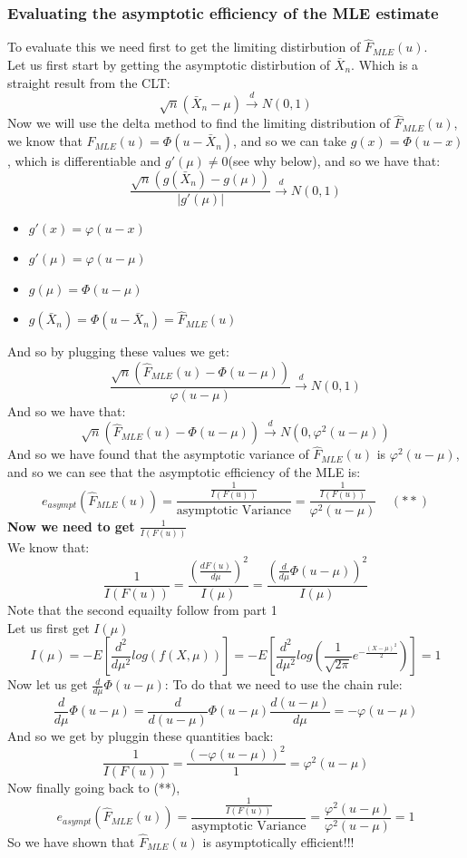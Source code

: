 \documentclass[12pt]{article}
\begin{document}
\subsubsection*{Evaluating the asymptotic efficiency of the MLE estimate}
To evaluate this we need first to get the limiting distirbution of $\hat{F}_{MLE}(u)$. \\ 
Let us first start by getting the asymptotic distirbution of $\bar{X}_n$. Which is a straight result from the CLT: 
\[
\sqrt{n}(\bar{X}_n - \mu) \xrightarrow{d} N(0,1)
\]
Now we will use the delta method to find the limiting distribution of $\hat{F}_{MLE}(u)$, we know that $\hat{F}_{MLE}(u) = \Phi(u-\bar{X}_n)$, and so we can take $g(x) = \Phi(u-x)$, which is differentiable and $g'(\mu) \neq 0$(see why below), and so we have that:
\[
\frac{\sqrt{n}(g(\bar{X}_n)-g(\mu))}{|g'(\mu)|} \xrightarrow{d} N(0,1)
\]
\begin{itemize}
  \item $g'(x) = \varphi(u-x)$
  \item $g'(\mu) = \varphi(u-\mu)$ \ \ \ \ \ 
  \item $g(\mu) = \Phi(u-\mu)$
  \item $g(\bar{X}_n) = \Phi(u-\bar{X}_n) =\hat{F}_{MLE}(u) $
\end{itemize}
And so by plugging these values we get:
\[
\frac{\sqrt{n}(\hat{F}_{MLE}(u)-\Phi(u-\mu))}{\varphi(u-\mu)} \xrightarrow{d} N(0,1)
\]
And so we have that:
\[
  \sqrt{n}(\hat{F}_{MLE}(u)-\Phi(u-\mu)) \xrightarrow{d} N(0,\varphi^2(u-\mu))
\]
And so we have found that the asymptotic variance of $\hat{F}_{MLE}(u)$ is $\varphi^2(u-\mu)$, and so we can see that the asymptotic efficiency of the MLE is:
\[
e_{asympt}(\hat{F}_{MLE}(u)) = \frac{\frac{1}{I(F(u))}}{\text{asymptotic Variance}} = \frac{\frac{1}{I(F(u))}}{\varphi^2(u-\mu)} \ \ \ \ \ (**)
\]
\textbf{Now we need to get $\frac{1}{I(F(u))}$}\\
We know that:
\[
\frac{1}{I(F(u))} = \frac{(\frac{dF(u)}{d\mu})^2}{I(\mu)} = \frac{(\frac{d}{d\mu}\Phi(u-\mu))^2}{I(\mu)}
\]
Note that the second equailty follow from part 1 \\ 
Let us first get $I(\mu)$
\[
I(\mu) = -E[\frac{d^2}{d\mu^2}log(f(X,\mu))] = -E[\frac{d^2}{d\mu^2}log(\frac{1}{\sqrt{2\pi}}e^{-\frac{(X-\mu)^2}{2}})] = 1 
\]
Now let us get $\frac{d}{d\mu}\Phi(u-\mu)$:
To do that we need to use the chain rule:
\[
\frac{d}{d\mu}\Phi(u-\mu) = \frac{d}{d(u-\mu)}\Phi(u-\mu)\frac{d(u-\mu)}{d\mu} = -\varphi(u-\mu)
\]
And so we get by pluggin these quantities back: 
\[
\frac{1}{I(F(u))} = \frac{(-\varphi(u-\mu))^2}{1} = \varphi^2(u-\mu)
\]
Now finally going back to (**), 
\[
e_{asympt}(\hat{F}_{MLE}(u)) = \frac{\frac{1}{I(F(u))}}{\text{asymptotic Variance}} = \frac{\varphi^2(u-\mu)}{\varphi^2(u-\mu)} = 1
\]
So we have shown that $\hat{F}_{MLE}(u)$ is asymptotically efficient!!!
\end{document}
